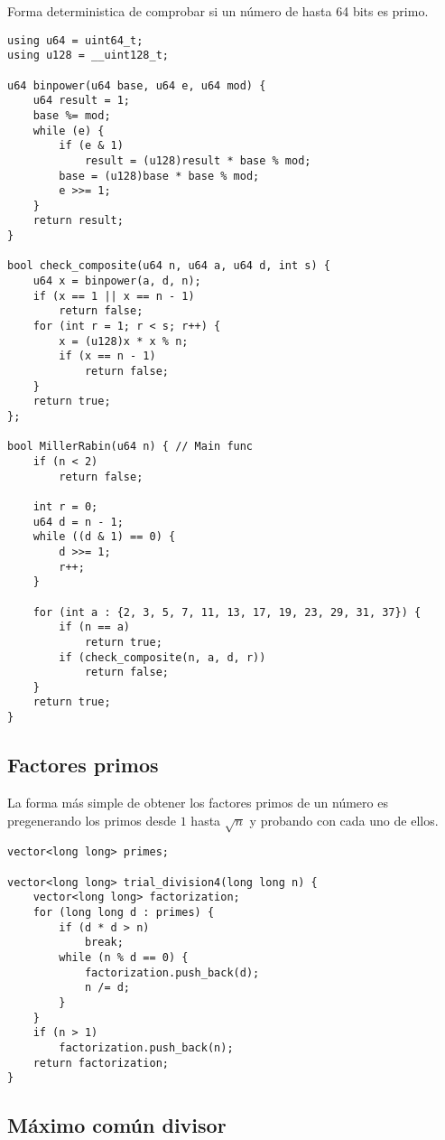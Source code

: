 \documentclass[11pt]{article}
\begin{document}
Forma deterministica de comprobar si un número de hasta 64 bits es primo. 

\begin{lstlisting}
using u64 = uint64_t;
using u128 = __uint128_t;

u64 binpower(u64 base, u64 e, u64 mod) {
    u64 result = 1;
    base %= mod;
    while (e) {
        if (e & 1)
            result = (u128)result * base % mod;
        base = (u128)base * base % mod;
        e >>= 1;
    }
    return result;
}

bool check_composite(u64 n, u64 a, u64 d, int s) {
    u64 x = binpower(a, d, n);
    if (x == 1 || x == n - 1)
        return false;
    for (int r = 1; r < s; r++) {
        x = (u128)x * x % n;
        if (x == n - 1)
            return false;
    }
    return true;
};

bool MillerRabin(u64 n) { // Main func
    if (n < 2)
        return false;

    int r = 0;
    u64 d = n - 1;
    while ((d & 1) == 0) {
        d >>= 1;
        r++;
    }

    for (int a : {2, 3, 5, 7, 11, 13, 17, 19, 23, 29, 31, 37}) {
        if (n == a)
            return true;
        if (check_composite(n, a, d, r))
            return false;
    }
    return true;
}
\end{lstlisting}

\subsection{Factores primos}

La forma más simple de obtener los factores primos de un número es pregenerando los primos desde $1$ hasta $\sqrt{n}$ y probando con cada uno de ellos.

\begin{lstlisting}
vector<long long> primes;

vector<long long> trial_division4(long long n) {
    vector<long long> factorization;
    for (long long d : primes) {
        if (d * d > n)
            break;
        while (n % d == 0) {
            factorization.push_back(d);
            n /= d;
        }
    }
    if (n > 1)
        factorization.push_back(n);
    return factorization;
}
\end{lstlisting}

\subsection{Máximo común divisor}
\end{document}
